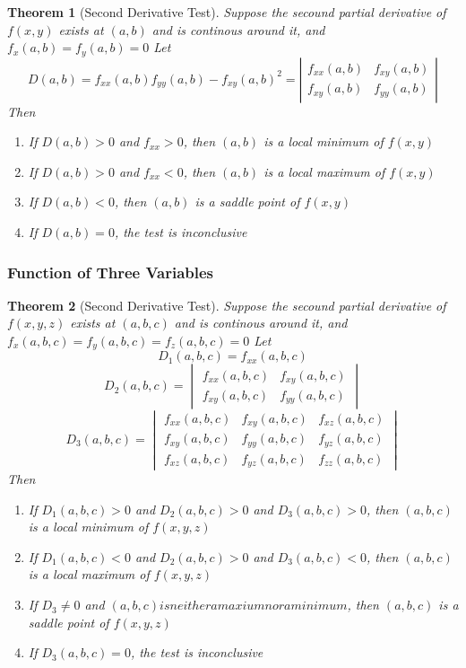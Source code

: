 \documentclass[12pt,a4paper]{article}
\newtheorem{theorem}{Theorem}[subsection]
\theoremstyle{definition}
\theoremstyle{remark}
\begin{document}
\begin{theorem}[Second Derivative Test]
Suppose the secound partial derivative of $f(x,y)$ exists at $(a,b)$ and is continous around it, and $f_x(a,b)=f_y(a,b) = 0$
Let 
\[
D(a,b) = f_{xx}(a,b) f_{yy}(a,b) - f_{xy}(a,b)^2 = \left| \begin{matrix} f_{xx}(a,b) & f_{xy}(a,b) \\ f_{xy}(a,b) & f_{yy}(a,b) \end{matrix} \right|
\]
Then 
\begin{enumerate}
	\item If $D(a,b) > 0$ and $f_{xx} > 0$, then $(a,b)$ is a local minimum of $f(x,y)$
	\item If $D(a,b) > 0$ and $f_{xx}<0$, then $(a,b)$ is a local maximum of $f(x,y)$
	\item If $D(a,b) < 0$, then $(a,b)$ is a saddle point of $f(x,y)$
	\item If $D(a,b) = 0$, the test is inconclusive
\end{enumerate}
\end{theorem}
\subsubsection{Function of Three Variables}
\begin{theorem}[Second Derivative Test]
Suppose the secound partial derivative of $f(x,y,z)$ exists at $(a,b,c)$ and is continous around it, and $f_x(a,b,c)=f_y(a,b,c)=f_z(a,b,c) = 0$
Let 
\[
	D_1(a, b, c) = f_{xx}(a,b,c)
\]
\[
	D_2(a, b, c) = \begin{vmatrix} f_{xx}(a,b,c) & f_{xy}(a,b,c) \\ f_{xy}(a,b,c) & f_{yy}(a,b,c) \end{vmatrix}
\]
\[
	D_3(a, b, c) = \begin{vmatrix} f_{xx}(a,b,c) & f_{xy}(a,b,c) & f_{xz}(a,b,c) \\ f_{xy}(a,b,c) & f_{yy}(a,b,c) & f_{yz}(a,b,c) \\ f_{xz}(a,b,c) & f_{yz}(a,b,c) & f_{zz}(a,b,c) \end{vmatrix}
\]
Then 
\begin{enumerate}
	\item If $D_1(a,b,c) > 0$ and $D_2(a,b,c) > 0$ and $D_3(a,b,c) > 0$, then $(a,b,c)$ is a local minimum of $f(x,y,z)$
	\item If $D_1(a,b,c) < 0$ and $D_2(a,b,c) > 0$ and $D_3(a,b,c) < 0$, then $(a,b,c)$ is a local maximum of $f(x,y,z)$
	\item If $D_3 \neq 0$ and $(a,b,c) is neither a maxium nor a minimum$, then $(a,b,c)$ is a saddle point of $f(x,y,z)$
	\item If $D_3(a,b,c) = 0$, the test is inconclusive

\end{enumerate}
\end{theorem}
\end{document}
